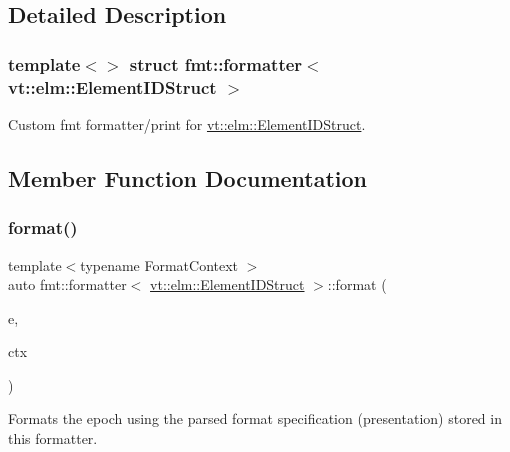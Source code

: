 \subsection{Detailed Description}
\subsubsection*{template$<$$>$\newline
struct fmt\+::formatter$<$ vt\+::elm\+::\+Element\+I\+D\+Struct $>$}

Custom fmt formatter/print for {\ttfamily \hyperlink{structvt_1_1elm_1_1_element_i_d_struct}{vt\+::elm\+::\+Element\+I\+D\+Struct}}. 

\subsection{Member Function Documentation}
\mbox{\label{structfmt_1_1formatter_3_01vt_1_1elm_1_1_element_i_d_struct_01_4_ac15c4718267371ae183ef4604a0da66f}} 
\subsubsection{\texorpdfstring{format()}{format()}}
{\footnotesize\ttfamily template$<$typename Format\+Context $>$ \\
auto fmt\+::formatter$<$ \hyperlink{structvt_1_1elm_1_1_element_i_d_struct}{vt\+::elm\+::\+Element\+I\+D\+Struct} $>$\+::format (\begin{DoxyParamCaption}\item[{\hyperlink{structvt_1_1elm_1_1_element_i_d_struct}{vt\+::elm\+::\+Element\+I\+D\+Struct} const \&}]{e,  }\item[{Format\+Context \&}]{ctx }\end{DoxyParamCaption})\hspace{0.3cm}{\ttfamily [inline]}}

Formats the epoch using the parsed format specification (presentation) stored in this formatter. \mbox{\label{structfmt_1_1formatter_3_01vt_1_1elm_1_1_element_i_d_struct_01_4_ab44d6b97885decc43c9f74e0a11e3c26}} 
